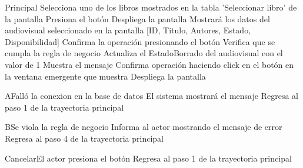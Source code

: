 
\begin{UCtrayectoria}{Principal}
		\UCpaso[\UCactor] Selecciona uno de los libros mostrados en la tabla 'Seleccionar libro' de la pantalla 
		\UCpaso[\UCactor] Presiona el botón  
		\UCpaso[\UCsist] Despliega la pantalla 
		\UCpaso[\UCsist] Mostrará los datos del audiovisual seleccionado en la pantalla [ID, Titulo, Autores, Estado, Disponibilidad]
		\UCpaso[\UCactor] Confirma la operación presionando el botón  
		\UCpaso[\UCsist] Verifica que se cumpla la regla de negocio  
		\UCpaso[\UCactor] Actualiza el EstadoBorrado del audiovisual con el valor de 1 
		\UCpaso[\UCsist] Muestra el mensaje 
		\UCpaso[\UCactor] Confirma operación haciendo click en el botón  en la ventana emergente que muestra
		\UCpaso[\UCsist] Despliega la pantalla 
\end{UCtrayectoria}




\begin{UCtrayectoriaA}{A}{Falló la conexion en la base de datos}
			\UCpaso[\UCsist] El sistema mostrará el mensaje 
			\UCpaso[\UCsist] Regresa al paso 1 de la trayectoria principal 
\end{UCtrayectoriaA}


\begin{UCtrayectoriaA}{B}{Se viola la regla de negocio }	
			\UCpaso[\UCsist] Informa al actor mostrando el mensaje de error 
			\UCpaso[\UCsist] Regresa al paso 4 de la trayectoria principal 
\end{UCtrayectoriaA}



\begin{UCtrayectoriaA}{Cancelar}{El actor presiona el botón }
			\UCpaso[\UCsist] Regresa al paso 1 de la trayectoria principal  
\end{UCtrayectoriaA}